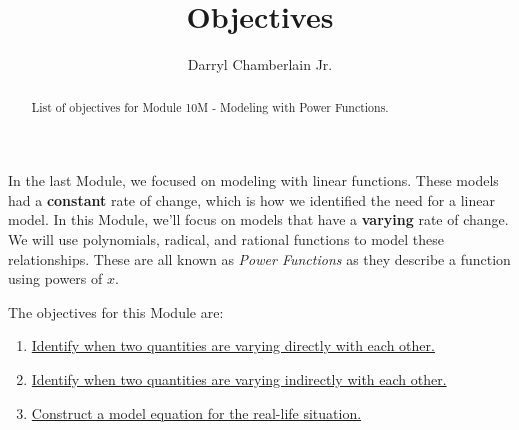 \documentclass{ximera}
\author{Darryl Chamberlain Jr.}
\title{Objectives}
\begin{document}
\begin{abstract}
List of objectives for Module 10M - Modeling with Power Functions.
\end{abstract}
\maketitle

In the last Module, we focused on modeling with linear functions. These models had a \textbf{constant} rate of change, which is how we identified the need for a linear model. In this Module, we'll focus on models that have a \textbf{varying} rate of change. We will use polynomials, radical, and rational functions to model these relationships. These are all known as \textit{Power Functions} as they describe a function using powers of $x$. 

\begin{comment}
Linear functions are power functions as well!
\end{comment}

The objectives for this Module are: 
\begin{enumerate}
    \item \href{https://cnx.org/contents/mwjClAV_@8.12:yUH0hROr@12/Modeling-Using-Variation}{Identify when two quantities are varying directly with each other.}
	\item \href{https://cnx.org/contents/mwjClAV_@8.12:yUH0hROr@12/Modeling-Using-Variation}{Identify when two quantities are varying indirectly with each other.}
	\item \href{https://cnx.org/contents/mwjClAV_@8.12:yUH0hROr@12/Modeling-Using-Variation}{Construct a model equation for the real-life situation.} 
\end{enumerate}
\end{document}
